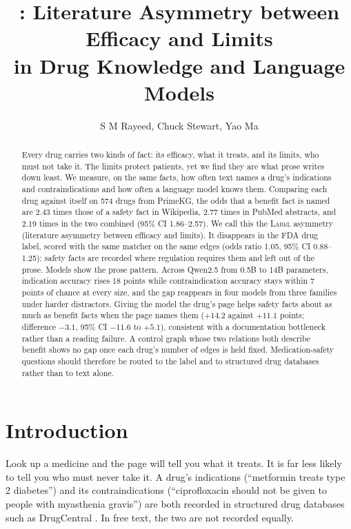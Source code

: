 \documentclass[letterpaper]{article} %
\title{\lbl{}: Literature Asymmetry between Efficacy and Limits\\in Drug Knowledge and Language Models}
\author{
    S M Rayeed,
    Chuck Stewart,
    Yao Ma
}
\newcommand{\lbl}{\textsc{Label}}
\begin{document}
\maketitle

\begin{abstract}
Every drug carries two kinds of fact: its efficacy, what it treats, and its
limits, who must not take it. The limits protect patients, yet we find they are
what prose writes down least. We measure, on the same facts, how often text names a drug's
indications and contraindications and how often a language model knows them.
Comparing each drug against itself on 574 drugs from PrimeKG, the odds that a
benefit fact is named are 2.43 times those of a safety fact in Wikipedia, 2.77
times in PubMed abstracts, and 2.19 times in the two combined (95\% CI
1.86--2.57). We call this the \lbl{} asymmetry (literature asymmetry between
efficacy and limits). It disappears in the FDA drug label, scored with the same
matcher on the same edges (odds ratio 1.05, 95\% CI 0.88--1.25): safety facts
are recorded where regulation requires them and left out of the prose.
Models show the prose pattern. Across Qwen2.5 from 0.5B to 14B parameters,
indication accuracy rises 18 points while contraindication accuracy stays
within 7 points of chance at every size, and the gap reappears in four models
from three families under harder distractors. Giving the model the drug's page
helps safety facts about as much as benefit facts when the page names them
($+14.2$ against $+11.1$ points; difference $-3.1$, 95\% CI $-11.6$ to $+5.1$),
consistent with a documentation bottleneck rather than a reading failure. A control graph whose two relations both describe benefit shows no gap
once each drug's number of edges is held fixed. Medication-safety questions
should therefore be routed to the label and to structured drug databases rather
than to text alone.
\end{abstract}

\section{Introduction}

Look up a medicine and the page will tell you what it treats. It is far less
likely to tell you who must never take it. A drug's indications (``metformin
treats type 2 diabetes'') and its contraindications (``ciprofloxacin should not
be given to people with myasthenia gravis'') are both recorded in structured
drug databases such as DrugCentral \citep{ursu2017drugcentral}. In free text,
the two are not recorded equally.
\end{document}

